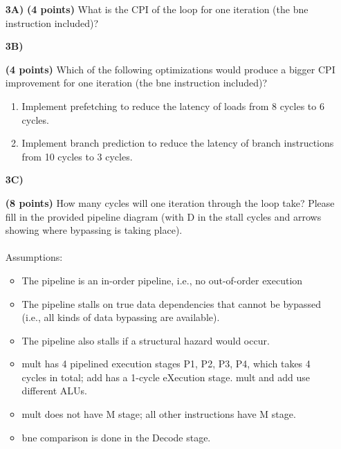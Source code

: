 \documentclass[a4paper,10pt]{article}
\begin{document}
\begin{enumerate}
{        \begin{enumerate}
            \item[\textbf{3A)}]{\textbf{(4 points)} What is the CPI of the loop for one iteration (the bne instruction included)?}
            \vspace{4cm}
            \item[\textbf{3B)}]{\textbf{(4 points)} Which of the following optimizations would produce a bigger CPI improvement for one iteration (the bne instruction included)?
                \begin{enumerate}
                    \item Implement prefetching to reduce the latency of loads from 8 cycles to 6 cycles.
                    \item Implement branch prediction to reduce the latency of branch instructions from 10 cycles to 3 cycles.
                \end{enumerate}
            }
            \vspace{4cm}
            \item[\textbf{3C)}]{\textbf{(8 points)} How many cycles will one iteration through the loop take? Please fill in the provided pipeline diagram (with D in the stall cycles and arrows showing where bypassing is taking place). \\ \\
                Assumptions:
                \begin{itemize}
                    \item The pipeline is an in-order pipeline, i.e., no out-of-order execution
                    \item	The pipeline stalls on true data dependencies that cannot be bypassed (i.e., all kinds of data bypassing are available).
                    \item 	The pipeline also stalls if a structural hazard would occur.
                    \item 	mult has 4 pipelined execution stages P1, P2, P3, P4, which takes 4 cycles in total; add has a 1-cycle eXecution stage. mult and add use different ALUs. 
                    \item 	mult does not have M stage; all other instructions have M stage.
                    \item 	bne comparison is done in the Decode stage.
                \end{itemize}
                
}
\end{enumerate}}
\end{enumerate}
\end{document}
